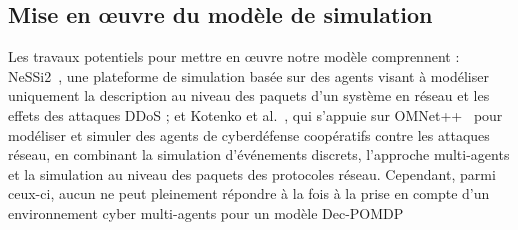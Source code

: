 \begin{enumerate*}[label=\arabic*),itemjoin={;\quad}]

\end{enumerate*}

\subsection{Mise en œuvre du modèle de simulation}

\noindent
Les travaux potentiels pour mettre en œuvre notre modèle comprennent : NeSSi2~\cite{DGrunewald2011}, une plateforme de simulation basée sur des agents visant à modéliser uniquement la description au niveau des paquets d'un système en réseau et les effets des attaques DDoS ; et Kotenko et al.~\cite{IKotenko2007}, qui s'appuie sur OMNet++~\cite{Varga2010} pour modéliser et simuler des agents de cyberdéfense coopératifs contre les attaques réseau, en combinant la simulation d'événements discrets, l'approche multi-agents et la simulation au niveau des paquets des protocoles réseau.
Cependant, parmi ceux-ci, aucun ne peut pleinement répondre à la fois à la prise en compte d'un environnement cyber multi-agents pour un modèle Dec-POMDP

